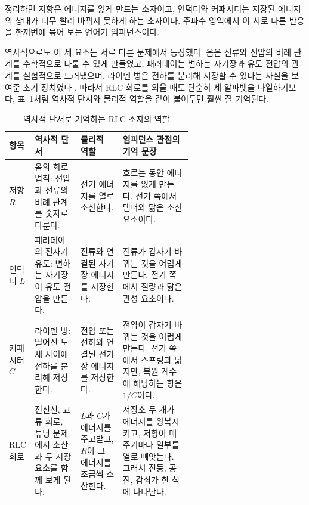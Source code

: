 정리하면 저항은 에너지를 잃게 만드는 소자이고, 인덕터와 커패시터는 저장된 에너지의 상태가 너무 빨리 바뀌지 못하게 하는 소자이다.
주파수 영역에서 이 서로 다른 반응을 한꺼번에 묶어 보는 언어가 임피던스이다.

역사적으로도 이 세 요소는 서로 다른 문제에서 등장했다.
옴은 전류와 전압의 비례 관계를 수학적으로 다룰 수 있게 만들었고, 패러데이는 변하는 자기장과 유도 전압의 관계를 실험적으로 드러냈으며, 라이덴 병은 전하를 분리해 저장할 수 있다는 사실을 보여준 초기 장치였다 \cite{ohm1827galvanischekette,faraday1832experimentalresearches,leyden_jar}.
따라서 RLC 회로를 외울 때도 단순히 세 알파벳을 나열하기보다, 표~\ref{tab:rlc-history-role}처럼 역사적 단서와 물리적 역할을 같이 붙여두면 훨씬 잘 기억된다.

\begin{table}[!htbp]
  \centering
  \caption{역사적 단서로 기억하는 RLC 소자의 역할}
  \small
  \setlength{\tabcolsep}{3pt}
  \begin{tabularx}{\linewidth}{@{}>{\raggedright\arraybackslash}p{0.13\linewidth}>{\raggedright\arraybackslash}p{0.25\linewidth}>{\raggedright\arraybackslash}p{0.23\linewidth}>{\raggedright\arraybackslash}X@{}}
    \toprule
    항목 & 역사적 단서 & 물리적 역할 & 임피던스 관점의 기억 문장 \\
    \midrule
    저항 $R$ & 옴의 회로 법칙: 전압과 전류의 비례 관계를 숫자로 다룬다. & 전기 에너지를 열로 소산한다. & 흐르는 동안 에너지를 잃게 만든다. 전기 쪽에서 댐퍼와 닮은 소산 요소이다. \\
    인덕터 $L$ & 패러데이의 전자기 유도: 변하는 자기장이 유도 전압을 만든다. & 전류와 연결된 자기장 에너지를 저장한다. & 전류가 갑자기 바뀌는 것을 어렵게 만든다. 전기 쪽에서 질량과 닮은 관성 요소이다. \\
    커패시터 $C$ & 라이덴 병: 떨어진 도체 사이에 전하를 분리해 저장한다. & 전압 또는 전하와 연결된 전기장 에너지를 저장한다. & 전압이 갑자기 바뀌는 것을 어렵게 만든다. 전기 쪽에서 스프링과 닮지만, 복원 계수에 해당하는 항은 $1/C$이다. \\
    RLC 회로 & 전신선, 교류 회로, 튜닝 문제에서 소산과 두 저장 요소를 함께 보게 된다. & $L$과 $C$가 에너지를 주고받고, $R$이 그 에너지를 조금씩 소산한다. & 저장소 두 개가 에너지를 왕복시키고, 저항이 매 주기마다 일부를 열로 빼앗는다. 그래서 진동, 공진, 감쇠가 한 식에 나타난다. \\
    \bottomrule
  \end{tabularx}
  \label{tab:rlc-history-role}
\end{table}


